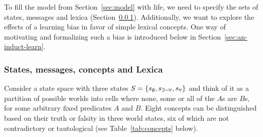 \documentclass[a4paper, 11pt]{article}
\theoremstyle{Satz}
\newcommand{\set}[1]{\left\{#1\right\}}
\newcommand{\States}{\ensuremath{S}\xspace}		%
\newcommand{\state}{\ensuremath{s}\xspace}		%
\newcommand{\mystate}[1]{\ensuremath{\state_{\text{#1}}}\xspace} %
\newcommand{\ssome}{\mystate{\ensuremath{\exists\neg\forall}}}
\newcommand{\sall}{\mystate{\ensuremath{\forall}}}
\newcommand{\snone}{\mystate{\ensuremath{\emptyset}}}
\begin{document}
To fill the model from Section~\ref{sec:model} with life, we need to specify the sets of
states, messages and lexica (Section~\ref{sec:stat-mess-conc}). Additionally, we want to
explore the effects of a learning bias in favor of simple lexical concepts. One way of
motivating and formalizing such a bias is introduced below in
Section~\ref{sec:an-induct-learn}.


\subsubsection{States, messages, concepts and Lexica} 
\label{sec:stat-mess-conc}

Consider a state space with three states $\States = \set{\snone, \ssome, \sall}$ and think of
it as a partition of possible worlds into cells where none, some or all of the $A$s are $B$s,
for some arbitrary fixed predicates $A$ and $B$. Eight concepts can be distinguished based on
their truth or falsity in three world states, six of which are not contradictory or
tautological (see Table~\ref{tab:concepts} below).
\end{document}
